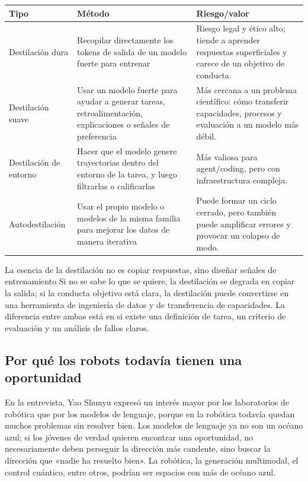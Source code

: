 \noindent\begin{tabularx}{\textwidth}{p{}p{}X}
\toprule
Tipo & Método & Riesgo/valor \\
\midrule
Destilación dura & Recopilar directamente los tokens de salida de un modelo fuerte para entrenar & Riesgo legal y ético alto; tiende a aprender respuestas superficiales y carece de un objetivo de conducta. \\
Destilación suave & Usar un modelo fuerte para ayudar a generar tareas, retroalimentación, explicaciones o señales de preferencia & Más cercana a un problema científico: cómo transferir capacidades, procesos y evaluación a un modelo más débil. \\
Destilación de entorno & Hacer que el modelo genere trayectorias dentro del entorno de la tarea, y luego filtrarlas o calificarlas & Más valiosa para agent/coding, pero con infraestructura compleja. \\
Autodestilación & Usar el propio modelo o modelos de la misma familia para mejorar los datos de manera iterativa & Puede formar un ciclo cerrado, pero también puede amplificar errores y provocar un colapso de modo. \\
\bottomrule
\end{tabularx}

\begin{importantbox}{La esencia de la destilación no es copiar respuestas, sino diseñar señales de entrenamiento}
Si no se sabe lo que se quiere, la destilación se degrada en copiar la salida; si la conducta objetivo está clara, la destilación puede convertirse en una herramienta de ingeniería de datos y de transferencia de capacidades. La diferencia entre ambas está en si existe una definición de tarea, un criterio de evaluación y un análisis de fallos claros.
\end{importantbox}

\subsection{Por qué los robots todavía tienen una oportunidad}

En la entrevista, Yao Shunyu expresó un interés mayor por los laboratorios de robótica que por los modelos de lenguaje, porque en la robótica todavía quedan muchos problemas sin resolver bien. Los modelos de lenguaje ya no son un océano azul; si los jóvenes de verdad quieren encontrar una oportunidad, no necesariamente deben perseguir la dirección más candente, sino buscar la dirección que «nadie ha resuelto bien». La robótica, la generación multimodal, el control cuántico, entre otros, podrían ser espacios con más de océano azul.

